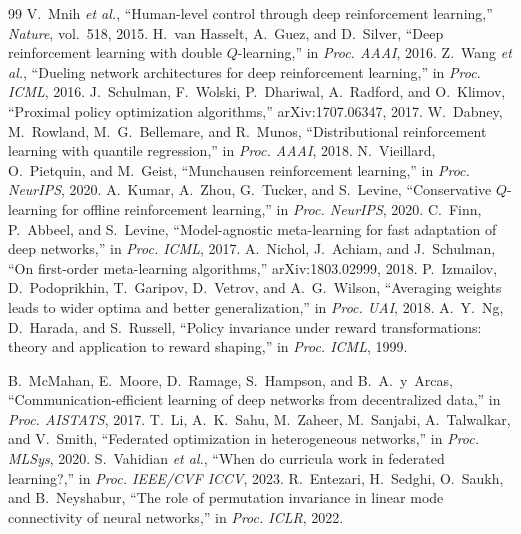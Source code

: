 \documentclass[conference]{IEEEtran}
\begin{document}
\begin{thebibliography}{99}
 V.~Mnih \emph{et al.}, ``Human-level control through deep
reinforcement learning,'' \emph{Nature}, vol.~518, 2015.
 H.~van Hasselt, A.~Guez, and D.~Silver, ``Deep reinforcement
learning with double $Q$-learning,'' in \emph{Proc. AAAI}, 2016.
 Z.~Wang \emph{et al.}, ``Dueling network architectures for deep
reinforcement learning,'' in \emph{Proc. ICML}, 2016.
 J.~Schulman, F.~Wolski, P.~Dhariwal, A.~Radford, and O.~Klimov,
``Proximal policy optimization algorithms,'' arXiv:1707.06347, 2017.
 W.~Dabney, M.~Rowland, M.~G.~Bellemare, and R.~Munos,
``Distributional reinforcement learning with quantile regression,'' in
\emph{Proc. AAAI}, 2018.
 N.~Vieillard, O.~Pietquin, and M.~Geist, ``Munchausen
reinforcement learning,'' in \emph{Proc. NeurIPS}, 2020.
 A.~Kumar, A.~Zhou, G.~Tucker, and S.~Levine, ``Conservative
$Q$-learning for offline reinforcement learning,'' in \emph{Proc. NeurIPS}, 2020.
 C.~Finn, P.~Abbeel, and S.~Levine, ``Model-agnostic meta-learning
for fast adaptation of deep networks,'' in \emph{Proc. ICML}, 2017.
 A.~Nichol, J.~Achiam, and J.~Schulman, ``On first-order
meta-learning algorithms,'' arXiv:1803.02999, 2018.
 P.~Izmailov, D.~Podoprikhin, T.~Garipov, D.~Vetrov, and
A.~G.~Wilson, ``Averaging weights leads to wider optima and better
generalization,'' in \emph{Proc. UAI}, 2018.
 A.~Y.~Ng, D.~Harada, and S.~Russell, ``Policy invariance
under reward transformations: theory and application to reward shaping,'' in
\emph{Proc. ICML}, 1999.

 B.~McMahan, E.~Moore, D.~Ramage, S.~Hampson, and
B.~A.~y~Arcas, ``Communication-efficient learning of deep networks from
decentralized data,'' in \emph{Proc. AISTATS}, 2017.
 T.~Li, A.~K.~Sahu, M.~Zaheer, M.~Sanjabi, A.~Talwalkar, and
V.~Smith, ``Federated optimization in heterogeneous networks,'' in \emph{Proc.
MLSys}, 2020.
 S.~Vahidian \emph{et al.}, ``When do curricula work in
federated learning?,'' in \emph{Proc. IEEE/CVF ICCV}, 2023.
 R.~Entezari, H.~Sedghi, O.~Saukh, and B.~Neyshabur, ``The role
of permutation invariance in linear mode connectivity of neural networks,'' in
\emph{Proc. ICLR}, 2022.

\end{thebibliography}
\end{document}
